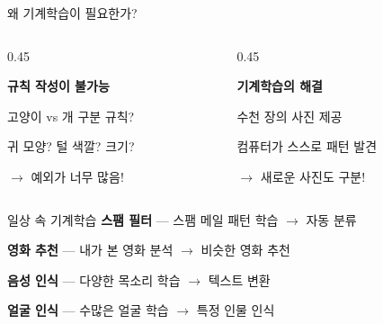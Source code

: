 \documentclass[aspectratio=169,11pt]{beamer}
\begin{document}
\begin{frame}{왜 기계학습이 필요한가?}
\begin{columns}
\begin{column}{0.45\textwidth}
\begin{center}
\textbf{\color{mainorange} 규칙 작성이 불가능}

\vspace{0.3cm}
고양이 vs 개 구분 규칙?

\vspace{0.2cm}
귀 모양? 털 색깔? 크기?

\vspace{0.2cm}
$\rightarrow$ 예외가 너무 많음!
\end{center}
\end{column}
\begin{column}{0.45\textwidth}
\begin{center}
\textbf{\color{maingreen} 기계학습의 해결}

\vspace{0.3cm}
수천 장의 사진 제공

\vspace{0.2cm}
컴퓨터가 스스로 패턴 발견

\vspace{0.2cm}
$\rightarrow$ 새로운 사진도 구분!
\end{center}
\end{column}
\end{columns}
\end{frame}

\begin{frame}{일상 속 기계학습}
 \textbf{스팸 필터} — 스팸 메일 패턴 학습 $\rightarrow$ 자동 분류

\vspace{0.4cm}
 \textbf{영화 추천} — 내가 본 영화 분석 $\rightarrow$ 비슷한 영화 추천

\vspace{0.4cm}
 \textbf{음성 인식} — 다양한 목소리 학습 $\rightarrow$ 텍스트 변환

\vspace{0.4cm}
 \textbf{얼굴 인식} — 수많은 얼굴 학습 $\rightarrow$ 특정 인물 인식
\end{frame}
\end{document}
